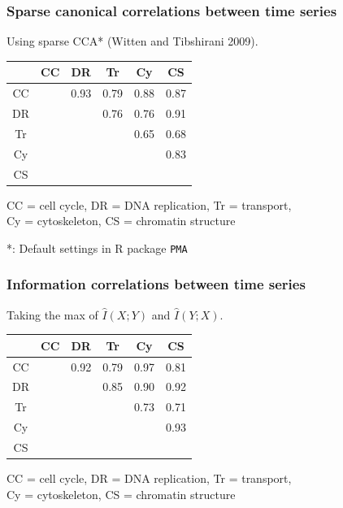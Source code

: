 \documentclass{beamer}
\begin{document}
\begin{frame}
\frametitle{Sparse canonical correlations between time series}
Using sparse CCA* (Witten and Tibshirani 2009).

\begin{center}
\begin{tabular}{c|c|c|c|c|c|} 
   & CC   & DR   & Tr   & Cy   & CS \\ \hline
CC &      & 0.93 & 0.79 & 0.88 & 0.87\\ \hline
DR &      &      & 0.76 & 0.76 & 0.91\\ \hline
Tr &      &      &      & 0.65 & 0.68\\ \hline
Cy &      &      &      &      & 0.83\\ \hline
CS &      &      &      &      &     \\ \hline
\end{tabular}
\end{center}

\vspace{0.5in}
CC = cell cycle, DR = DNA replication, Tr = transport, \\
Cy = cytoskeleton, CS = chromatin structure

\vspace{0.1in}

\tiny{*: Default settings in R package {\tt PMA}}
\end{frame}


\begin{frame}
\frametitle{Information correlations between time series}
Taking the max of $\hat{I}(X; Y)$ and $\hat{I}(Y; X)$.

\begin{center}
\begin{tabular}{c|c|c|c|c|c|} 
   & CC   & DR   & Tr   & Cy   & CS \\ \hline
CC &      & 0.92 & 0.79 & 0.97 & 0.81\\ \hline
DR &      &      & 0.85 & 0.90 & 0.92\\ \hline
Tr &      &      &      & 0.73 & 0.71\\ \hline
Cy &      &      &      &      & 0.93\\ \hline
CS &      &      &      &      &     \\ \hline
\end{tabular}
\end{center}

\vspace{0.5in}
CC = cell cycle, DR = DNA replication, Tr = transport, \\
Cy = cytoskeleton, CS = chromatin structure
\end{frame}
\end{document}
